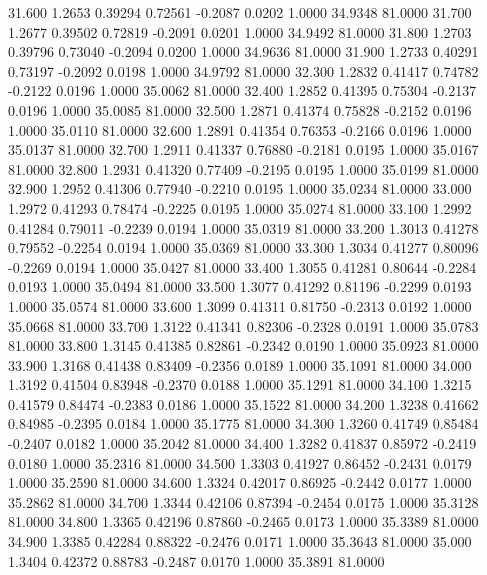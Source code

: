   31.600   1.2653   0.39294   0.72561  -0.2087   0.0202   1.0000  34.9348  81.0000
  31.700   1.2677   0.39502   0.72819  -0.2091   0.0201   1.0000  34.9492  81.0000
  31.800   1.2703   0.39796   0.73040  -0.2094   0.0200   1.0000  34.9636  81.0000
  31.900   1.2733   0.40291   0.73197  -0.2092   0.0198   1.0000  34.9792  81.0000
  32.300   1.2832   0.41417   0.74782  -0.2122   0.0196   1.0000  35.0062  81.0000
  32.400   1.2852   0.41395   0.75304  -0.2137   0.0196   1.0000  35.0085  81.0000
  32.500   1.2871   0.41374   0.75828  -0.2152   0.0196   1.0000  35.0110  81.0000
  32.600   1.2891   0.41354   0.76353  -0.2166   0.0196   1.0000  35.0137  81.0000
  32.700   1.2911   0.41337   0.76880  -0.2181   0.0195   1.0000  35.0167  81.0000
  32.800   1.2931   0.41320   0.77409  -0.2195   0.0195   1.0000  35.0199  81.0000
  32.900   1.2952   0.41306   0.77940  -0.2210   0.0195   1.0000  35.0234  81.0000
  33.000   1.2972   0.41293   0.78474  -0.2225   0.0195   1.0000  35.0274  81.0000
  33.100   1.2992   0.41284   0.79011  -0.2239   0.0194   1.0000  35.0319  81.0000
  33.200   1.3013   0.41278   0.79552  -0.2254   0.0194   1.0000  35.0369  81.0000
  33.300   1.3034   0.41277   0.80096  -0.2269   0.0194   1.0000  35.0427  81.0000
  33.400   1.3055   0.41281   0.80644  -0.2284   0.0193   1.0000  35.0494  81.0000
  33.500   1.3077   0.41292   0.81196  -0.2299   0.0193   1.0000  35.0574  81.0000
  33.600   1.3099   0.41311   0.81750  -0.2313   0.0192   1.0000  35.0668  81.0000
  33.700   1.3122   0.41341   0.82306  -0.2328   0.0191   1.0000  35.0783  81.0000
  33.800   1.3145   0.41385   0.82861  -0.2342   0.0190   1.0000  35.0923  81.0000
  33.900   1.3168   0.41438   0.83409  -0.2356   0.0189   1.0000  35.1091  81.0000
  34.000   1.3192   0.41504   0.83948  -0.2370   0.0188   1.0000  35.1291  81.0000
  34.100   1.3215   0.41579   0.84474  -0.2383   0.0186   1.0000  35.1522  81.0000
  34.200   1.3238   0.41662   0.84985  -0.2395   0.0184   1.0000  35.1775  81.0000
  34.300   1.3260   0.41749   0.85484  -0.2407   0.0182   1.0000  35.2042  81.0000
  34.400   1.3282   0.41837   0.85972  -0.2419   0.0180   1.0000  35.2316  81.0000
  34.500   1.3303   0.41927   0.86452  -0.2431   0.0179   1.0000  35.2590  81.0000
  34.600   1.3324   0.42017   0.86925  -0.2442   0.0177   1.0000  35.2862  81.0000
  34.700   1.3344   0.42106   0.87394  -0.2454   0.0175   1.0000  35.3128  81.0000
  34.800   1.3365   0.42196   0.87860  -0.2465   0.0173   1.0000  35.3389  81.0000
  34.900   1.3385   0.42284   0.88322  -0.2476   0.0171   1.0000  35.3643  81.0000
  35.000   1.3404   0.42372   0.88783  -0.2487   0.0170   1.0000  35.3891  81.0000
